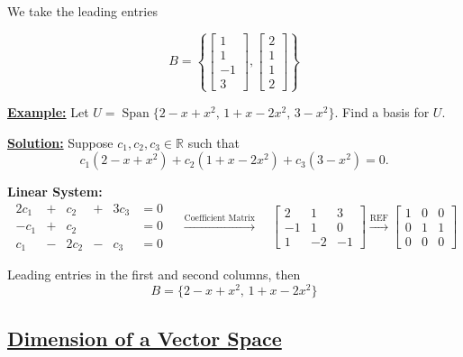 We take the leading entries

\[
B = \left\{
    \begin{bmatrix} 1 \\ 1 \\ -1 \\ 3 \end{bmatrix},
    \begin{bmatrix} 2 \\ 1 \\ 1 \\ 2 \end{bmatrix}
\right\}
\]

\bigskip

\underline{\textbf{Example:}} Let $U = \operatorname{Span}\{2 - x + x^2,\, 1 + x - 2x^2,\, 3 - x^2\}$. Find a basis for $U$.

\bigskip
\bigskip

\underline{\textbf{Solution:}} Suppose $c_1, c_2, c_3 \in \mathbb{R}$ such that
\[
c_1(2-x+x^2) + c_2(1+x-2x^2) + c_3(3-x^2) = 0.
\]

\medskip

\textbf{Linear System:}
\[
\begin{alignedat}{4}
2c_1 & {}+{} &  c_2 & {}+{} & 3c_3 & {}={} 0 \\
 -c_1 & {}+{} &  c_2 &       &      & {}={} 0 \\
  c_1 & {}-{} & 2c_2 & {}-{} &  c_3 & {}={} 0
\end{alignedat}
\quad\xrightarrow{\text{Coefficient Matrix}}\quad
\begin{bmatrix}
 2 &  1 &  3 \\
-1 &  1 &  0 \\
 1 & -2 & -1
\end{bmatrix}
\xrightarrow{\text{REF}}
\begin{bmatrix}
1 & 0 & 0 \\
0 & 1 & 1 \\
0 & 0 & 0
\end{bmatrix}
\]

\medskip

\noindent Leading entries in the first and second columns, then
\[
B = \{2 - x + x^2,\, 1 + x - 2x^2\}
\]

\bigskip


\subsection{\underline{Dimension of a Vector Space}}



